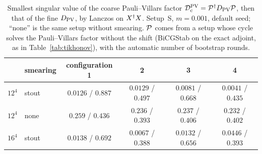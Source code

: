 \begin{table}[htbp]
\centering
\caption{\New Smallest singular value of the coarse Pauli--Villars factor $\mathcal D_{\mathrm c}^{\mathrm{PV}}=\mathcal P^{\dagger}D_{\mathrm{PV}}\mathcal P$, then
that of the fine $D_{\mathrm{PV}}$, by Lanczos on $X^{\dagger} X$. Setup~S, $m=0.001$, default seed; ``none'' is the same
setup without smearing. $\mathcal P$ comes from a setup whose cycle solves the Pauli--Villars factor without
the shift (BiCGStab on the exact adjoint, as in Table~\ref{tab:tikhonov}), with the automatic number of
bootstrap rounds.}
\label{tab:pvsv}
\renewcommand{\arraystretch}{1.15}
\setlength{\tabcolsep}{4pt}
\begin{tabular}{@{}llcccc@{}}
\toprule
 & smearing & configuration 1 & 2 & 3 & 4\\
\midrule
$12^4$ & stout & $0.0126$ / $0.887$ & $0.0129$ / $0.497$ & $0.0081$ / $0.668$ & $0.0041$ / $0.435$\\
$12^4$ & none & $0.259$ / $0.436$ & $0.236$ / $0.393$ & $0.237$ / $0.406$ & $0.232$ / $0.402$\\
$16^4$ & stout & $0.0138$ / $0.692$ & $0.0067$ / $0.388$ & $0.0132$ / $0.656$ & $0.0446$ / $0.393$\\
\bottomrule
\end{tabular}
\end{table}

